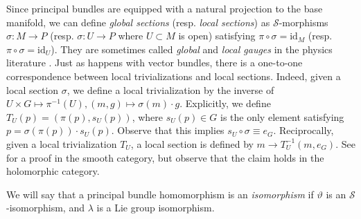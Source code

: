 \begin{obs} \label{obs_bijection_triv_sect}
    Since principal bundles are equipped with a natural projection to the base manifold, we can define \textit{global sections} (resp. \textit{local sections}) as \(\mathcal{S}\)-morphisms \(\sigma\colon M \to P\) (resp. \(\sigma\colon U \to P\) where \(U \subset M\) is open) satisfying \(\pi\circ \sigma=\mathrm{id}_M\) (resp. \(\pi \circ \sigma=\mathrm{id}_U\)). They are sometimes called \textit{global} and \textit{local gauges} in the physics literature \parencite{hamilton2018mathematical}. Just as happens with vector bundles, there is a one-to-one correspondence between local trivializations and local sections. Indeed, given a local section \(\sigma\), we define a local trivialization by the inverse of \(U \times G \mapsto \pi^{-1}(U), (m,g) \mapsto \sigma(m)\cdot g\). Explicitly, we define \(T_U(p)=(\pi(p), s_U(p))\), where \(s_U(p)\in G\) is the only element satisfying \(p=\sigma(\pi(p))\cdot s_U(p)\). Observe that this implies \(s_U \circ \sigma \equiv e_G\). Reciprocally, given a local trivialization \(T_U\), a local section is defined by \(m \to T_U^{-1}(m, e_G)\). See \parencite[Prop. 1.1.6]{Rudolph_2017pug} for a proof in the smooth category, but observe that the claim holds in the holomorphic category. 
\end{obs}

We will say that a principal bundle homomorphism is an \textit{isomorphism} if \(\vartheta\) is an \(\mathcal{S}\)-isomorphism, and \(\lambda\) is a Lie group isomorphism. 

